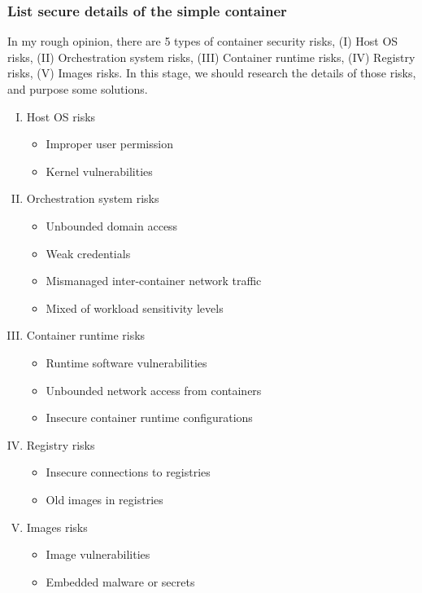 \documentclass[12pt,a4paper]{article}
\begin{document}
\subsubsection{List secure details of the simple container}
In my rough opinion, there are 5 types of container security risks, (\RN{1}) Host OS risks, (\RN{2})
Orchestration system risks, (\RN{3}) Container runtime risks, (\RN{4}) Registry risks, (\RN{5})
Images risks. In this stage, we should research the details of those risks, and purpose some solutions.
\\
\begin{enumerate}[I.]
  \item{Host OS risks}
        \begin{itemize}
          \item Improper user permission
          \item Kernel vulnerabilities
        \end{itemize}
  \item{Orchestration system risks}
        \begin{itemize}
          \item Unbounded domain access
          \item Weak credentials
          \item Mismanaged inter-container network traffic
          \item Mixed of workload sensitivity levels
        \end{itemize}
  \item{Container runtime risks}
        \begin{itemize}
          \item Runtime software vulnerabilities
          \item Unbounded network access from containers
          \item Insecure container runtime configurations
        \end{itemize}
  \item{Registry risks}
        \begin{itemize}
          \item Insecure connections to registries
          \item Old images in registries
        \end{itemize}
  \item{Images risks}
        \begin{itemize}
          \item Image vulnerabilities
          \item Embedded malware or secrets
        \end{itemize}
\end{enumerate}
\end{document}
